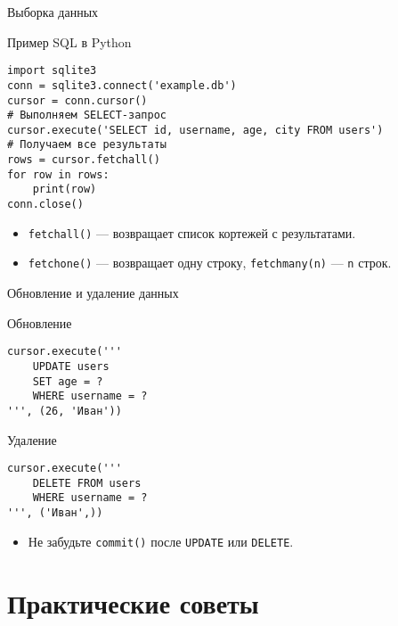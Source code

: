 \documentclass{beamer}
\begin{document}
\begin{frame}[fragile]{Выборка данных}
	\begin{block}{Пример SQL в Python}
		\begin{verbatim}
import sqlite3
conn = sqlite3.connect('example.db')
cursor = conn.cursor()
# Выполняем SELECT-запрос
cursor.execute('SELECT id, username, age, city FROM users')
# Получаем все результаты
rows = cursor.fetchall()
for row in rows:
    print(row)
conn.close()
\end{verbatim}
	\end{block}

	\begin{itemize}
		\item \texttt{fetchall()} — возвращает список кортежей с результатами.
		\item \texttt{fetchone()} — возвращает одну строку, \texttt{fetchmany(n)} — \texttt{n} строк.
	\end{itemize}
\end{frame}

\begin{frame}[fragile]{Обновление и удаление данных}
	\begin{block}{Обновление}
		\begin{verbatim}
cursor.execute('''
    UPDATE users
    SET age = ?
    WHERE username = ?
''', (26, 'Иван'))
\end{verbatim}
	\end{block}

	\begin{block}{Удаление}
		\begin{verbatim}
cursor.execute('''
    DELETE FROM users
    WHERE username = ?
''', ('Иван',))
\end{verbatim}
	\end{block}

	\begin{itemize}
		\item Не забудьте \texttt{commit()} после \texttt{UPDATE} или \texttt{DELETE}.
	\end{itemize}
\end{frame}

\section{Практические советы}
\end{document}
